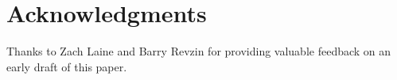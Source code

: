 \documentclass{wg21}
\begin{document}
\section{Acknowledgments}

Thanks to Zach Laine and Barry Revzin for providing valuable feedback on an early draft of this paper.






\renewcommand{\section}[2]{}%

\begin{thebibliography}{9}


\end{thebibliography}
\end{document}
